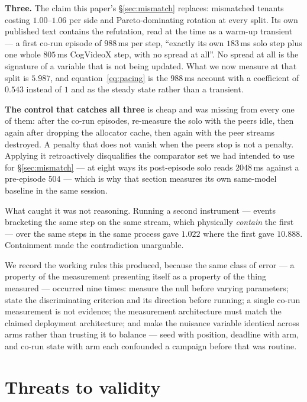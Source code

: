 \documentclass[sigconf,nonacm]{acmart}
\begin{document}
\textbf{Three.} The claim this paper's \S\ref{sec:mismatch} replaces:
mismatched tenants costing $1.00$--$1.06$ per side and Pareto-dominating
rotation at every split. Its own published text contains the refutation,
read at the time as a warm-up transient --- a first co-run episode of
$988$\,ms per step, ``exactly its own $183$\,ms solo step plus one whole
$805$\,ms CogVideoX step, with no spread at all''. No spread at all is
the signature of a variable that is not being updated. What we now
measure at that split is $5.987$, and equation~\ref{eq:pacing} is the
$988$\,ms account with a coefficient of $0.543$ instead of $1$ and as the
steady state rather than a transient.

\textbf{The control that catches all three} is cheap and was missing from
every one of them: after the co-run episodes, re-measure the solo with
the peers idle, then again after dropping the allocator cache, then again
with the peer streams destroyed. A penalty that does not vanish when the
peers stop is not a penalty. Applying it retroactively disqualifies the
comparator set we had intended to use for \S\ref{sec:mismatch} --- at
eight ways its post-episode solo reads $2048$\,ms against a pre-episode
$504$ --- which is why that section measures its own same-model baseline
in the same session.

What caught it was not reasoning. Running a second instrument --- events
bracketing the same step on the same stream, which physically
\emph{contain} the first --- over the same steps in the same process
gave $1.022$ where the first gave $10.888$. Containment made the
contradiction unarguable.

We record the working rules this produced, because the same class of
error --- a property of the measurement presenting itself as a property
of the thing measured --- occurred nine times: measure the null before
varying parameters; state the discriminating criterion and its direction
before running; a single co-run measurement is not evidence; the
measurement architecture must match the claimed deployment architecture;
and make the nuisance variable identical across arms rather than
trusting it to balance --- seed with position, deadline with arm, and
co-run state with arm each confounded a campaign before that was
routine.

\section{Threats to validity}
\end{document}
